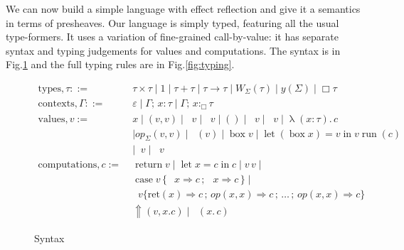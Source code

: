 \documentclass[acmsmall, screen, nonacm]{acmart}
\theoremstyle{definition}
\newcommand{\glob}{\mathop{\Box}}
\newcommand{\yoneda}[1]{y(#1)}
\newcommand{\reflectname}{\Uparrow}
\newcommand{\performraw}[2]{\mathop{\reflectname(#1(#2))}}
\newcommand{\perform}[5]{\performraw{#1}{#2}(#3, #4. #5)}
\newcommand{\reifyname}{\Downarrow}
\newcommand{\reifyraw}[1]{\mathop{\reifyname_{#1}}}
\newcommand{\reify}[3]{\reifyraw{#1}(#2.\,#3)}
\newcommand{\outl}[1]{\mathop{\mathrm{out}_L} #1}
\newcommand{\outr}[1]{\mathop{\mathrm{out}_R} #1}
\newcommand{\ind}[1]{W_{#1}}
\newcommand{\indintro}[4]{#2_{#1}(#3, #4)}
\newcommand{\retname}{\mathrm{ret}}
\newcommand{\ret}[2]{\mathop{\retname_{#1}}(#2)}
\newcommand{\indelim}[3]{\mathop{\mathrm{rec}_{#1}} #2 \{#3\}}
\newcommand{\indretcase}[2]{\retname(#1) \Rightarrow #2}
\newcommand{\indcase}[4]{#1(#2, #3) \Rightarrow #4}
\newcommand{\seq}{\,;\,}
\newcommand{\fst}{\mathop{\pi_1}}
\newcommand{\snd}{\mathop{\pi_2}}
\newcommand{\inl}[1]{\mathop{\mathrm{in}_L} #1}
\newcommand{\inr}[1]{\mathop{\mathrm{in}_R} #1}
\newcommand{\case}[5]{\mathop{\mathrm{case}} #1 \,\{\,\inl{#2} \Rightarrow #3 \seq \inr{#4} \Rightarrow #5 \,\}}
\newcommand{\abs}[3]{\mathop{\lambda}(#1 \types #2).\,#3}
\newcommand{\app}[2]{#1\,#2}
\newcommand{\types}{\mathrel{:}}
\newcommand{\gtypes}{\mathrel{:_{\Box}}}
\newcommand{\cempty}{\varepsilon}
\newcommand{\ccons}[2]{#1;\,#2}
\newcommand{\lbind}[3]{\ccons{#1}{#2\types#3}}
\newcommand{\gbind}[3]{\ccons{#1}{#2\gtypes#3}}
\newcommand{\return}[1]{\mathop{\mathrm{return}} #1}
\newcommand{\letv}[3]{\mathop{\mathrm{let}} #1 = #2 \mathop{\mathrm{in}} #3}
\newcommand{\gbox}[1]{\mathop{\mathrm{box}} #1}
\newcommand{\gunbox}[4]{\mathop{\mathrm{let}} (\gbox #1) = #2 \mathop{\mathrm{in}} #3}
\newcommand{\grun}[1]{\mathop{\mathrm{run}}(#1)}
\begin{document}
We can now build a simple language with effect reflection and give it a
semantics in terms of presheaves. Our language is simply typed,
featuring all the usual type-formers. It uses a variation of
fine-grained call-by-value: it has separate syntax and typing judgements
for values and computations. The syntax is in Fig.\ref{fig:syntax} and 
the full typing rules are in Fig.\ref{fig:typing}.
\begin{figure}
\begin{align*}
  \mathrm{types}, \tau ::=\;& \tau \times \tau \mid 1 \mid \tau + \tau
                              \mid \tau \rightarrow \tau \mid
                              \ind{\Sigma}(\tau) \mid \yoneda{\Sigma}
                              \mid \glob \tau \\
  \mathrm{contexts}, \Gamma ::=\;& \cempty \mid \lbind{\Gamma}{x}{\tau} \mid \gbind{\Gamma}{x}{\tau} \\
  \mathrm{values}, v :=\;& x \mid (v, v) \mid \fst v \mid \snd v
                           \mid () \mid \inl{v} \mid \inr{v} \mid \abs{x}{\tau}{c} \\
                         &\mid \indintro{\Sigma}{op}{v}{v} \mid \ret{\Sigma}{v}
                           \mid \gbox{v} \mid \gunbox{x}{v}{v} \mid \grun{c} \\
                            &\mid \outl{v} \mid \outr{v} \\
  \mathrm{computations}, c :=\;& \return{v} \mid \letv{x}{c}{c}
                                 \mid \app{v}{v} \mid \\
                            & \case{v}{x}{c}{x}{c} \mid \\
                            & \indelim{\Sigma}{v}
                              {\indretcase{x}{c} \seq
                              \indcase{op}{x}{x}{c} \seq \ldots
                              \seq \indcase{op}{x}{x}{c}} \\
                            & \perform{v}{op}{v}{x}{c} \mid \reify{\Sigma}{x}{c}
\end{align*}
\caption{Syntax}
\label{fig:syntax}
\end{figure}
\end{document}
